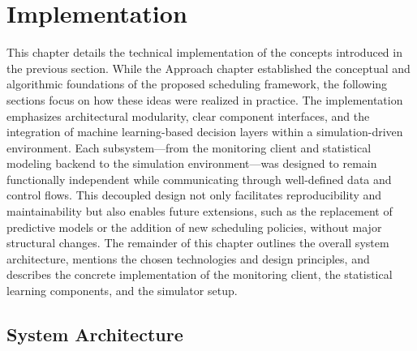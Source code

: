 \section{Implementation}
\label{cha:implementation}
This chapter details the technical implementation of the concepts introduced in the previous section. While the Approach chapter established the conceptual and algorithmic foundations of the proposed scheduling framework, the following sections focus on how these ideas were realized in practice. The implementation emphasizes architectural modularity, clear component interfaces, and the integration of machine learning-based decision layers within a simulation-driven environment. Each subsystem—from the monitoring client and statistical modeling backend to the simulation environment—was designed to remain functionally independent while communicating through well-defined data and control flows. This decoupled design not only facilitates reproducibility and maintainability but also enables future extensions, such as the replacement of predictive models or the addition of new scheduling policies, without major structural changes. The remainder of this chapter outlines the overall system architecture, mentions the chosen technologies and design principles, and describes the concrete implementation of the monitoring client, the statistical learning components, and the simulator setup.

\subsection{System Architecture}
\label{sec:system_architecture}


